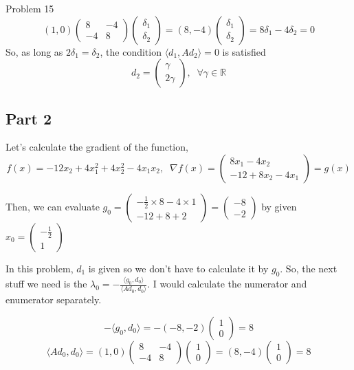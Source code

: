 \documentclass[12pt]{article}
\begin{document}
\begin{section}{Problem 15}
	$$(1,0) \begin{pmatrix}
	8 & -4\\
    -4 & 8 \end{pmatrix} \begin{pmatrix}
	\delta_1\\
     \delta_2 \end{pmatrix} = (8, -4) \begin{pmatrix}
     \delta_1\\
     \delta_2 \end{pmatrix} = 8\delta_1 - 4\delta_2 = 0$$
    So, as long as $2\delta_1 = \delta_2$, the condition $\langle d_1, Ad_2 \rangle = 0$ is satisfied
    $$d_2 = \begin{pmatrix}
    \gamma\\
    2\gamma \end{pmatrix}, \;\; \forall \gamma \in \mathbb{R}$$	
	\subsection{Part 2}
	
	Let's calculate the gradient of the function,
	\[f(x) = -12x_2 + 4x_1^2 + 4x_2^2-4x_1x_2, \;\; \nabla f(x) = \begin{pmatrix}
	8x_1 - 4x_2\\
	-12 + 8x_2 - 4x_1 \end{pmatrix} = g(x)\]
	
	Then, we can evaluate $g_0 = \begin{pmatrix}
	-\frac{1}{2} \times 8 - 4 \times 1\\
	-12 + 8 + 2
	\end{pmatrix} = \begin{pmatrix}
	-8\\
	-2
	\end{pmatrix}$ by given $x_0 = \begin{pmatrix}
	-\frac{1}{2}\\
	1
	\end{pmatrix}$
	
	In this problem, $d_1$ is given so we don't have to calculate it by $g_0$. So, the next stuff we need is the $\lambda_0 = -\frac{ \langle g_0, d_0 \rangle}{\langle Ad_0, d_0\rangle}$. I would calculate the numerator and enumerator separately.
	
	\[-\langle g_0, d_0 \rangle = -(-8, -2) \begin{pmatrix}
	1\\
	0
	\end{pmatrix} = 8\] 
	\[\langle Ad_0, d_0 \rangle  = (1,0) \begin{pmatrix}
	8 & -4\\
	-4 & 8
	\end{pmatrix} \begin{pmatrix}
	1\\
	0
	\end{pmatrix} = (8, -4) \begin{pmatrix}
	1\\
	0
	\end{pmatrix} = 8\]
	

\end{section}
\end{document}
